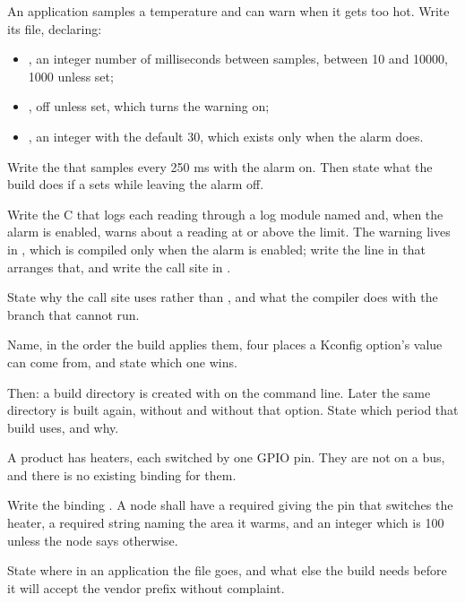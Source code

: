  An application samples a temperature and can warn when it gets too hot. Write its
 file, declaring:
\begin{itemize}
  \item {}, an integer number of milliseconds between samples, between 10
    and 10000, 1000 unless set;
  \item {}, off unless set, which turns the warning on;
  \item {}, an integer with the default 30, which exists only when the alarm
    does.
\end{itemize}
Write the  that samples every 250 ms with the alarm on. Then state what the build
does if a  sets  while leaving the alarm off.

 Write the C that logs each reading through a log module named  and, when the
alarm is enabled, warns about a reading at or above the limit. The warning lives in
, which is compiled only when the alarm is enabled; write the line in
 that arranges that, and write the call site in .

State why the call site uses  rather than , and what the compiler
does with the branch that cannot run. 

 Name, in the order the build applies them, four places a Kconfig option's value can come
from, and state which one wins.

Then: a build directory is created with  on the command line.
Later the same directory is built again, without  and without that option. State which
period that build uses, and why. 

\label{exb:q:3}
A product has heaters, each switched by one GPIO pin. They are not on a bus, and there is no
existing binding for them.

 Write the binding . A node shall have a required
 giving the pin that switches the heater, a required string  naming
the area it warms, and an integer  which is 100 unless the node says
otherwise.

State where in an application the file goes, and what else the build needs before it will accept the
vendor prefix  without complaint. 

